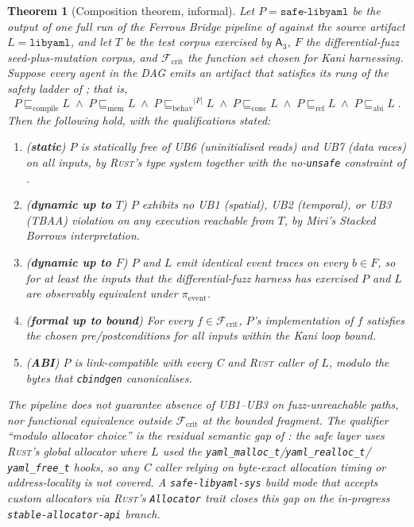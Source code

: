 \documentclass[12pt]{article}
\newtheorem{theorem}{Theorem}[section]
\theoremstyle{definition}
\theoremstyle{remark}
\newcommand{\rust}{\textnormal{\textsc{Rust}}}
\newcommand{\libyaml}{\texttt{libyaml}}
\newcommand{\safelibyaml}{\texttt{safe-libyaml}}
\newcommand{\Agent}[1]{\ensuremath{\mathsf{#1}}}
\newcommand{\Compile}{\ensuremath{\sqsubseteq_{\!\mathrm{compile}}}}
\newcommand{\Memory}{\ensuremath{\sqsubseteq_{\!\mathrm{mem}}}}
\newcommand{\Behav}{\ensuremath{\sqsubseteq_{\!\mathrm{behav}}}}
\newcommand{\Conc}{\ensuremath{\sqsubseteq_{\!\mathrm{conc}}}}
\newcommand{\Refine}{\ensuremath{\sqsubseteq_{\!\mathrm{ref}}}}
\newcommand{\ABI}{\ensuremath{\sqsubseteq_{\!\mathrm{abi}}}}
\begin{document}
\begin{theorem}[Composition theorem, informal]
\label{thm:composition}
Let \(P = \safelibyaml{}\) be the output of one full run of the
Ferrous Bridge pipeline of  against the source
artifact \(L = \libyaml{}\), and let \(T\) be the test corpus exercised
by \(\Agent{A}_3\), \(F\) the differential-fuzz seed-plus-mutation
corpus, and \(\mathcal{F}_{\mathrm{crit}}\) the function set chosen
for Kani harnessing. Suppose every agent in the DAG emits an artifact
that satisfies its rung of the safety ladder of
; that is,
\begin{equation*}
P \Compile L
\;\wedge\; P \Memory L
\;\wedge\; P \Behav^{|F|} L
\;\wedge\; P \Conc L
\;\wedge\; P \Refine L
\;\wedge\; P \ABI L \;.
\end{equation*}
Then the following hold, with the qualifications stated:
\begin{enumerate}
\item (\textbf{static}) \(P\) is statically free of UB6
  (uninitialised reads) and UB7 (data races) on \emph{all} inputs, by
  \rust{}'s type system together with the no-\texttt{unsafe}
  constraint of .
\item (\textbf{dynamic up to \(T\)}) \(P\) exhibits no UB1
  (spatial), UB2 (temporal), or UB3 (TBAA) violation on any execution
  reachable from \(T\), by Miri's Stacked Borrows interpretation.
\item (\textbf{dynamic up to \(F\)}) \(P\) and \(L\) emit identical
  event traces on every \(b \in F\), so for at least the inputs that
  the differential-fuzz harness has exercised \(P\) and \(L\) are
  observably equivalent under \(\pi_{\mathrm{event}}\).
\item (\textbf{formal up to bound}) For every
  \(f \in \mathcal{F}_{\mathrm{crit}}\), \(P\)'s implementation of
  \(f\) satisfies the chosen pre/postconditions for all inputs within
  the Kani loop bound.
\item (\textbf{ABI}) \(P\) is link-compatible with every C and \rust{}
  caller of \(L\), modulo the bytes that \texttt{cbindgen} canonicalises.
\end{enumerate}
The pipeline does \emph{not} guarantee absence of UB1--UB3 on
fuzz-unreachable paths, nor functional equivalence outside
\(\mathcal{F}_{\mathrm{crit}}\) at the bounded fragment. The
qualifier ``modulo allocator choice'' is the residual semantic gap of
: the safe layer uses \rust{}'s global allocator
where \(L\) used the \texttt{yaml\_malloc\_t}/\texttt{yaml\_realloc\_t}/
\texttt{yaml\_free\_t} hooks, so any C caller relying on byte-exact
allocation timing or address-locality is not covered. A
\texttt{safe-libyaml-sys} build mode that accepts custom allocators
via \rust{}'s \texttt{Allocator} trait closes this gap on the
in-progress \texttt{stable-allocator-api} branch.
\end{theorem}
\end{document}
